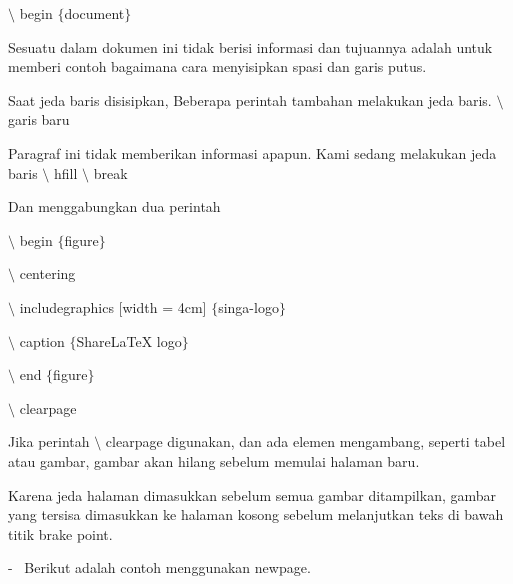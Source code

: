 \begin{itemize}
\hspace*{0.5in}$\setminus$ begin $ \{ $document$ \} $\par
\vspace{\baselineskip}
Sesuatu dalam dokumen ini tidak berisi informasi dan tujuannya adalah untuk memberi contoh bagaimana cara menyisipkan spasi dan garis putus.\par
\vspace{\baselineskip}
Saat jeda baris disisipkan, Beberapa perintah tambahan melakukan jeda baris. $\setminus$garis baru\par
\vspace{\baselineskip}
Paragraf ini tidak memberikan informasi apapun. Kami sedang melakukan jeda baris $\setminus$ hfill $\setminus$ break\par
\vspace{\baselineskip}
Dan menggabungkan dua perintah\par
\vspace{\baselineskip}
\hspace*{0.5in}$\setminus$ begin $ \{ $figure$ \} $\par

\hspace*{0.5in}$\setminus$ centering\par

\hspace*{0.5in}$\setminus$ includegraphics [width = 4cm] $ \{ $singa-logo$ \} $\par

\hspace*{0.5in}$\setminus$ caption $ \{ $ShareLaTeX logo$ \} $\par

\hspace*{0.5in}$\setminus$ end $ \{ $figure$ \} $\par

\hspace*{0.5in}$\setminus$ clearpage\par
\vspace{\baselineskip}
Jika perintah $\setminus$ clearpage digunakan, dan ada elemen mengambang, seperti tabel atau gambar, gambar akan hilang sebelum memulai halaman baru.\par
\vspace{\baselineskip}
Karena jeda halaman dimasukkan sebelum semua gambar ditampilkan, gambar yang tersisa dimasukkan ke halaman kosong sebelum melanjutkan teks di bawah titik brake point.\par
\vspace{\baselineskip}
\hspace*{0.5in}-~ Berikut adalah contoh menggunakan newpage.\par


\end{itemize}
